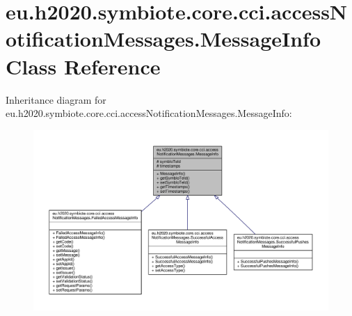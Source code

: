 \hypertarget{classeu_1_1h2020_1_1symbiote_1_1core_1_1cci_1_1accessNotificationMessages_1_1MessageInfo}{}\section{eu.\+h2020.\+symbiote.\+core.\+cci.\+access\+Notification\+Messages.\+Message\+Info Class Reference}
\label{classeu_1_1h2020_1_1symbiote_1_1core_1_1cci_1_1accessNotificationMessages_1_1MessageInfo}


Inheritance diagram for eu.\+h2020.\+symbiote.\+core.\+cci.\+access\+Notification\+Messages.\+Message\+Info\+:
\nopagebreak
\begin{figure}[H]
\begin{center}
\leavevmode
\includegraphics[width=350pt]{classeu_1_1h2020_1_1symbiote_1_1core_1_1cci_1_1accessNotificationMessages_1_1MessageInfo__inherit__graph}
\end{center}
\end{figure}


